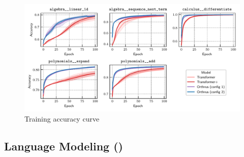 \begin{figure}
    \centering
    \includegraphics[width=\textwidth]{figs/experiments/math/math_training_curves_trainacc.pdf}
    \caption{Training accuracy curve}
\end{figure}


\subsection{Language Modeling ()}\label{ssec:appendix_lm}

\begin{table}
    \caption{}\label{tab:}
    
\end{table}

